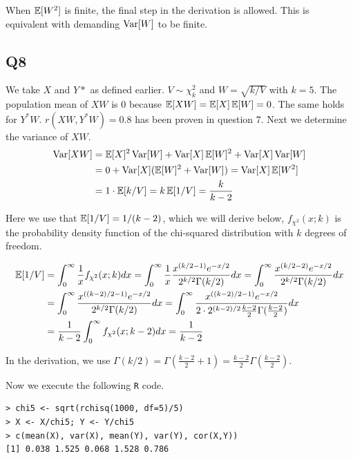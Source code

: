 When $\operatorname{\mathbb{E}}[W^2]$ is finite, the final step in the derivation is allowed. This is equivalent with demanding $\operatorname{\text{Var}}[W]$ to be finite.

\subsection*{Q8}

We take $X$ and $Y*$ as defined earlier. $V \sim \chi^2_k$ and $W = \sqrt{k/V}$ with $k=5$.  The population mean of $XW$ is $0$ because $\operatorname{\mathbb{E}}[XW] = \operatorname{\mathbb{E}}[X]\operatorname{\mathbb{E}}[W] = 0$. The same holds for $Y^{*}W$. $r(XW,Y^{*}W) = 0.8$ has been proven in question $7$.
Next we determine the variance of $XW$.
\begin{align*}
\operatorname{\text{Var}}[XW] & = \operatorname{\mathbb{E}}[X]^2 \operatorname{\text{Var}}[W] + \operatorname{\text{Var}}[X] \operatorname{\mathbb{E}}[W]^2 + \operatorname{\text{Var}}[X]\operatorname{\text{Var}}[W] \\
         & =  0 + \operatorname{\text{Var}}[X](\operatorname{\mathbb{E}}[W]^2 + \operatorname{\text{Var}}[W]) = \operatorname{\text{Var}}[X]\operatorname{\mathbb{E}}[W^2] \\
         & = 1 \cdot \operatorname{\mathbb{E}}[k/V] = k \operatorname{\mathbb{E}}[1/V] = \frac{k}{k-2}
\end{align*}

Here we use that $\operatorname{\mathbb{E}}[1/V] = 1/(k-2)$, which we will derive below,  $f_{\chi^2}(x; k)$ is the probability density function of the chi-squared distribution with $k$ degrees of freedom.

\begin{align*}
\operatorname{\mathbb{E}}[1/V] & = \int_{0}^{\infty} \frac{1}{x} f_{\chi^2}(x; k) dx = \int_{0}^{\infty} \frac{1}{x} \frac{x^{\left( k/2 - 1\right) }e^{-x/2}}{2^{k/2}\Gamma(k/2)} dx = \int_{0}^{\infty} \frac{x^{\left( k/2 - 2\right) }e^{-x/2}}{2^{k/2}\Gamma(k/2)} dx \\
        & = \int_{0}^{\infty} \frac{x^{\left(\left(k-2\right)/2 - 1\right) }e^{-x/2}}{2^{k/2}\Gamma(k/2)} dx = \int_{0}^{\infty} \frac{x^{\left(\left(k-2\right)/2 - 1\right) }e^{-x/2}}{2 \cdot 2^{\left(k-2\right)/2}\frac{k-2}{2} \Gamma(\frac{k-2}{2})} dx \\
        & = \frac{1}{k-2} \int_{0}^{\infty} f_{\chi^2}(x; k-2) dx = \frac{1}{k-2}
\end{align*}

In the derivation, we use $\Gamma(k/2) = \Gamma(\frac{k-2}{2} + 1) = \frac{k-2}{2} \Gamma(\frac{k-2}{2})$.

Now we execute the following \verb|R| code.

\begin{verbatim}
> chi5 <- sqrt(rchisq(1000, df=5)/5)
> X <- X/chi5; Y <- Y/chi5 
> c(mean(X), var(X), mean(Y), var(Y), cor(X,Y))
[1] 0.038 1.525 0.068 1.528 0.786
\end{verbatim}

